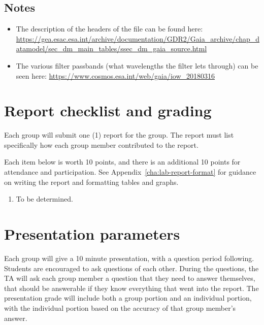 \subsection{Notes}

\begin{itemize}
	\item The description of the headers of the file can be found here: \url{https://gea.esac.esa.int/archive/documentation/GDR2/Gaia_archive/chap_datamodel/sec_dm_main_tables/ssec_dm_gaia_source.html}
	
	\item The various filter passbands (what wavelengths the filter lets through) can be seen here: \url{https://www.cosmos.esa.int/web/gaia/iow_20180316}
\end{itemize}

\section{Report checklist and grading}

Each group will submit one (1) report for the group. The report must list specifically how each group member contributed to the report.

Each item below is worth 10 points, and there is an additional 10 points for attendance and participation. See Appendix\ \ref{cha:lab-report-format} for guidance on writing the report and formatting tables and graphs.

\begin{enumerate}
	\item To be determined.
\end{enumerate}

\section{Presentation parameters}

Each group will give a 10 minute presentation, with a question period following. Students are encouraged to ask questions of each other. During the questions, the TA will ask each group member a question that they need to answer themselves, that should be answerable if they know everything that went into the report. The presentation grade will include both a group portion and an individual portion, with the individual portion based on the accuracy of that group member's answer.